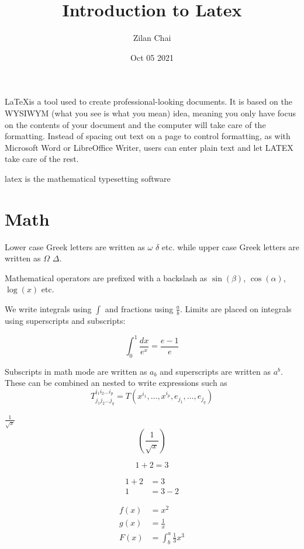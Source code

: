 \documentclass[12pt,fullpagea4paper,a4paper,doublespace]{article}
\title{Introduction to Latex}
\author{Zilan Chai}
\date{Oct 05 2021}
\begin{document}
\maketitle

\LaTeX is a tool used to create professional-looking documents. It is based on the WYSIWYM (what you see is what you mean) idea, meaning you only have focus on the contents of your document and the computer will take care of the formatting. Instead of spacing out text on a page to control formatting, as with Microsoft Word or LibreOffice Writer, users can enter plain text and let LATEX take care of the rest.

latex is the mathematical typesetting software


\section{Math}

Lower case Greek letters are written as $\omega$ $\delta$ etc. while upper case Greek letters are written as $\Omega$ $\Delta$.

Mathematical operators are prefixed with a backslash as $\sin(\beta)$, $\cos(\alpha)$, $\log(x)$ etc.


We write integrals using $\int$ and fractions using $\frac{a}{b}$. Limits are placed on integrals using superscripts and subscripts:

\[ \int_0^1 \frac{dx}{e^x} =  \frac{e-1}{e} \]

Subscripts in math mode are written as $a_b$ and superscripts are written as $a^b$. These can be combined an nested to write expressions such as
\[ T^{i_1 i_2 \dots i_p}_{j_1 j_2 \dots j_q} = T(x^{i_1},\dots,x^{i_p},e_{j_1},\dots,e_{j_q}) \]


$\frac{1}{\sqrt{x}}$\\
$$\left(\frac{1}{\sqrt{x}}\right)$$

\begin{equation*}
  1 + 2 = 3 
\end{equation*}
 
\begin{align*}
  1 + 2 &= 3\\
  1 &= 3 - 2
\end{align*}


\begin{align*}
  f(x) &= x^2\\
  g(x) &= \frac{1}{x}\\
  F(x) &= \int^a_b \frac{1}{3}x^3
\end{align*}
\end{document}

